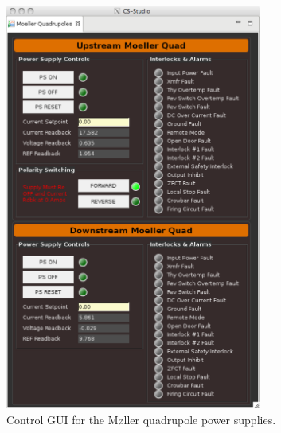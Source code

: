 \begin{enumerate}
\begin{enumerate}
\begin{figure}
\begin{center}
\includegraphics[width=0.75\textwidth]{pics/moller_quad.pdf}
\caption{Control GUI for the M{\o}ller quadrupole power supplies.}
\label{fig:moller_quad}
\end{center}
\end{figure}





\end{enumerate}
\end{enumerate}
